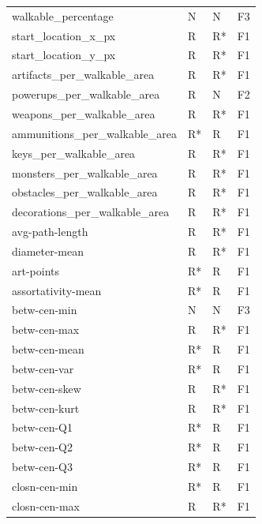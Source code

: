 \begin{longtable}{llll}
		walkable\_percentage           &      N &    N &    F3 \\
		start\_location\_x\_px           &      R &   R* &    F1 \\
		start\_location\_y\_px           &      R &   R* &    F1 \\
		artifacts\_per\_walkable\_area   &      R &   R* &    F1 \\
		powerups\_per\_walkable\_area    &      R &    N &    F2 \\
		weapons\_per\_walkable\_area     &      R &   R* &    F1 \\
		ammunitions\_per\_walkable\_area &     R* &    R &    F1 \\
		keys\_per\_walkable\_area        &      R &   R* &    F1 \\
		monsters\_per\_walkable\_area    &      R &   R* &    F1 \\
		obstacles\_per\_walkable\_area   &      R &   R* &    F1 \\
		decorations\_per\_walkable\_area &      R &   R* &    F1 \\
		avg-path-length               &      R &   R* &    F1 \\
		diameter-mean                 &      R &   R* &    F1 \\
		art-points                    &     R* &    R &    F1 \\
		assortativity-mean            &     R* &    R &    F1 \\
		betw-cen-min                  &      N &    N &    F3 \\
		betw-cen-max                  &      R &   R* &    F1 \\
		betw-cen-mean                 &     R* &    R &    F1 \\
		betw-cen-var                  &     R* &    R &    F1 \\
		betw-cen-skew                 &      R &   R* &    F1 \\
		betw-cen-kurt                 &      R &   R* &    F1 \\
		betw-cen-Q1                   &     R* &    R &    F1 \\
		betw-cen-Q2                   &     R* &    R &    F1 \\
		betw-cen-Q3                   &     R* &    R &    F1 \\
		closn-cen-min                 &     R* &    R &    F1 \\
		closn-cen-max                 &      R &   R* &    F1 \\

\end{longtable}
